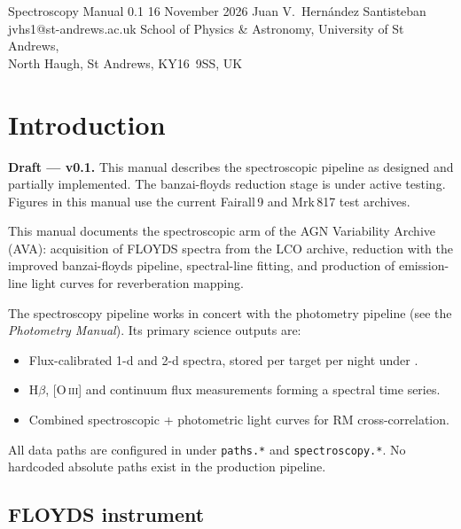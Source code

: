 \documentclass[a4paper,12pt]{article}
\begin{document}
\avatitlepage
  {Spectroscopy Manual}
  {0.1}
  {16 November 2026}
  {Juan V.\ Hern\'{a}ndez Santisteban}
  {jvhs1@st-andrews.ac.uk}
  {School of Physics \& Astronomy, University of St Andrews,\\
   North Haugh, St Andrews, KY16~9SS, UK}

\tableofcontents
\clearpage

\section{Introduction}
\label{sec:intro}

\begin{warnbox}
\textbf{Draft --- v0.1.}  This manual describes the spectroscopic pipeline
as designed and partially implemented.  The banzai-floyds reduction stage
is under active testing.  Figures in this manual use the current Fairall\,9
and Mrk\,817 test archives.
\end{warnbox}

This manual documents the spectroscopic arm of the AGN Variability Archive (AVA):
acquisition of FLOYDS spectra from the LCO archive, reduction with the improved
banzai-floyds pipeline, spectral-line fitting, and production of emission-line
light curves for reverberation mapping.

The spectroscopy pipeline works in concert with the photometry pipeline
(see the \emph{Photometry Manual}).  Its primary science outputs are:
\begin{itemize}
  \item Flux-calibrated 1-d and 2-d spectra, stored per target per night under
        .
  \item H$\beta$, [O\,\textsc{iii}] and continuum flux measurements forming a
        spectral time series.
  \item Combined spectroscopic + photometric light curves for RM cross-correlation.
\end{itemize}

All data paths are configured in  under
\texttt{paths.*} and \texttt{spectroscopy.*}.  No hardcoded absolute paths exist
in the production pipeline.

\subsection{FLOYDS instrument}
\end{document}
